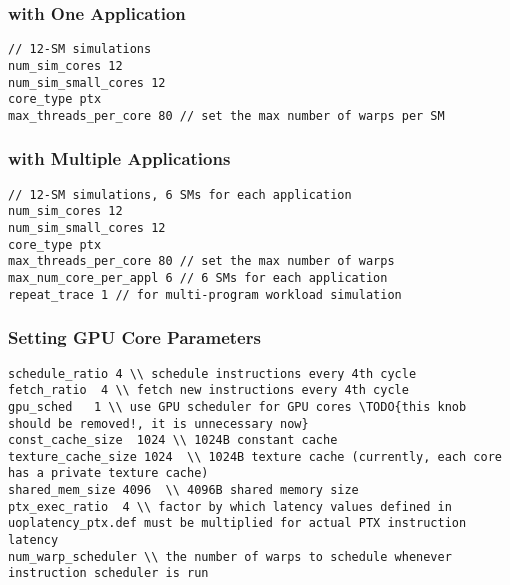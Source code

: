 \subsubsection{\gpu with One Application}

\begin{Verbatim}
// 12-SM simulations
num_sim_cores 12
num_sim_small_cores 12
core_type ptx
max_threads_per_core 80 // set the max number of warps per SM
\end{Verbatim}


\subsubsection{\gpu with Multiple Applications}

\begin{Verbatim}
// 12-SM simulations, 6 SMs for each application
num_sim_cores 12
num_sim_small_cores 12
core_type ptx
max_threads_per_core 80 // set the max number of warps 
max_num_core_per_appl 6 // 6 SMs for each application
repeat_trace 1 // for multi-program workload simulation
\end{Verbatim}


\subsubsection{Setting GPU Core Parameters}

\begin{Verbatim}
schedule_ratio 4 \\ schedule instructions every 4th cycle
fetch_ratio  4 \\ fetch new instructions every 4th cycle
gpu_sched   1 \\ use GPU scheduler for GPU cores \TODO{this knob should be removed!, it is unnecessary now}
const_cache_size  1024 \\ 1024B constant cache
texture_cache_size 1024  \\ 1024B texture cache (currently, each core has a private texture cache)
shared_mem_size 4096  \\ 4096B shared memory size 
ptx_exec_ratio  4 \\ factor by which latency values defined in uoplatency_ptx.def must be multiplied for actual PTX instruction latency
num_warp_scheduler \\ the number of warps to schedule whenever instruction scheduler is run
\end{Verbatim}



